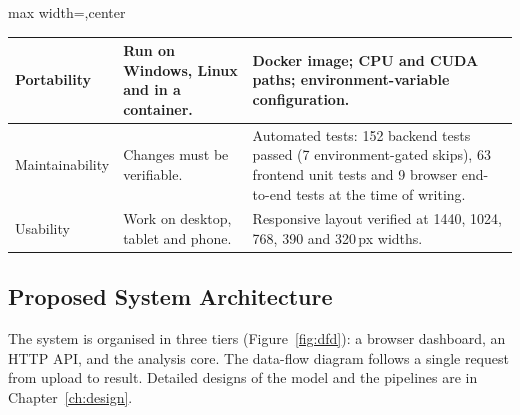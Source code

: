 \begin{table}[ht]
\begin{adjustbox}{max width=\linewidth,center}
\begin{tabular}{|p{2.4cm}|p{5.0cm}|p{4.6cm}|}
Portability & Run on Windows, Linux and in a container. & Docker image; CPU and CUDA paths; environment-variable configuration. \\ \hline
Maintainability & Changes must be verifiable. & Automated tests: 152 backend tests passed (7 environment-gated skips), 63 frontend unit tests and 9 browser end-to-end tests at the time of writing. \\ \hline
Usability & Work on desktop, tablet and phone. & Responsive layout verified at 1440, 1024, 768, 390 and 320\,px widths. \\ \hline
\end{tabular}
\end{adjustbox}
\end{table}

\subsection{Proposed System Architecture}
The system is organised in three tiers (Figure~\ref{fig:dfd}): a browser dashboard, an HTTP API, and the analysis core. The
data-flow diagram follows a single request from upload to result. Detailed designs of the model and the pipelines are in
Chapter~\ref{ch:design}.

